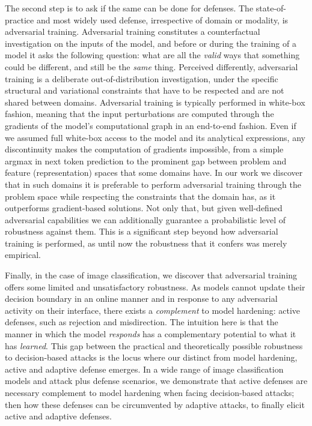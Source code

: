 The second step is to ask if the same can be done for defenses.
The state-of-practice and most widely used defense, irrespective of domain or modality, is adversarial training.
Adversarial training constitutes a counterfactual investigation on the inputs of the model, and before or during the training of a model it asks the following question: what are all the \textit{valid} ways that something could be different, and still be the \textit{same} thing.
Perceived differently, adversarial training is a deliberate out-of-distribution investigation, under the specific structural and variational constraints that have to be respected and are not shared between domains.
Adversarial training is typically performed in white-box fashion, meaning that the input perturbations are computed through the gradients of the model's computational graph in an end-to-end fashion.
Even if we assumed full white-box access to the model and its analytical expressions, any discontinuity makes the computation of gradients impossible, from a simple argmax in next token prediction to the prominent gap between problem and feature (representation) spaces that some domains have.
In our work we discover that in such domains it is preferable to perform adversarial training through the problem space while respecting the constraints that the domain has, as it outperforms gradient-based solutions.
Not only that, but given well-defined adversarial capabilities we can additionally guarantee a probabilistic level of robustness against them.
This is a significant step beyond how adversarial training is performed, as until now the robustness that it confers was merely empirical.

Finally, in the case of image classification, we discover that adversarial training offers some limited and unsatisfactory robustness.
As models cannot update their decision boundary in an online manner and in response to
any adversarial activity on their interface, there exists a \textit{complement} to model hardening: active defenses, such as rejection and misdirection.
The intuition here is that the manner in which the model \textit{responds} has a complementary potential to what it has \textit{learned}.
This gap between the practical and theoretically possible robustness to decision-based attacks is the locus where our distinct from model hardening, active and adaptive defense emerges.
In a wide range of image classification models and attack plus defense scenarios, we demonstrate that active defenses are necessary complement to model hardening when facing decision-based attacks; then how these defenses can be circumvented by adaptive attacks, to finally elicit active and adaptive defenses.

